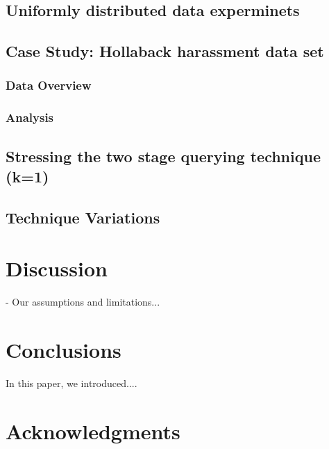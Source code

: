 \documentclass{acm_proc_article-sp}
\begin{document}
\subsection{Uniformly distributed data experminets}
\subsection{Case Study: Hollaback harassment data set}
\subsubsection{Data Overview}
\subsubsection{Analysis}
\subsection{Stressing the two stage querying technique (k=1)}
\subsection{Technique Variations}
\section{Discussion}
- Our assumptions and limitations...

\section{Conclusions}
In this paper, we introduced.... 

\section{Acknowledgments}


{\footnotesize
}  %
%
%
\end{document}
